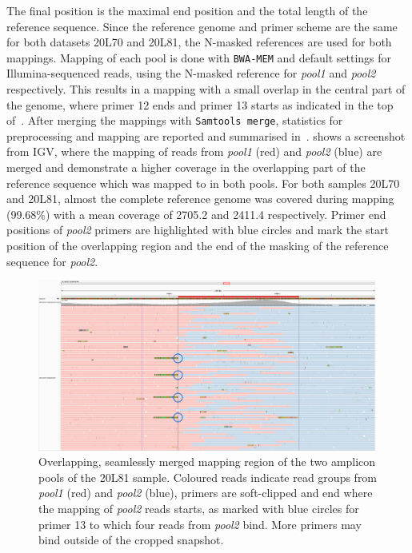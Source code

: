 The final position is the maximal end position and the total length of the reference sequence. Since the reference genome and primer scheme are the same for both datasets 20L70 and 20L81, the N-masked references are used for both mappings. Mapping of each pool is done with \texttt{BWA-MEM} and default settings for Illumina-sequenced reads, using the N-masked reference for \textit{pool1} and \textit{pool2} respectively. This results in a mapping with a small overlap in the central part of the genome, where primer 12 ends and primer 13 starts as indicated in the top of~. After merging the mappings with \texttt{Samtools merge}, statistics for preprocessing and mapping are reported and summarised in~.  shows a screenshot from \ac{IGV}, where the mapping of reads from \textit{pool1} (red) and \textit{pool2} (blue) are merged and demonstrate a higher coverage in the overlapping part of the reference sequence which was mapped to in both pools. For both samples 20L70 and 20L81, almost the complete reference genome was covered during mapping (99.68\%) with a mean coverage of {2705.2\texttimes } and {2411.4\texttimes } respectively. Primer end positions of \textit{pool2} primers are highlighted with blue circles and mark the start position of the overlapping region and the end of the masking of the reference sequence for \textit{pool2}.
\\

\begin{figure}[ht!]
    \centering
    \hspace*{-24pt}
    \includegraphics[width=1.1\textwidth]{media/4-lsdv-alig-20L81-c.png}
    \caption[Overlapping reads region of LSDV mapping in 20L81 sample.]{Overlapping, seamlessly merged mapping region of the two amplicon pools of the 20L81 sample. Coloured reads indicate read groups from \textit{pool1} (red) and \textit{pool2} (blue), primers are soft-clipped and end where the mapping of \textit{pool2} reads starts, as marked with blue circles for primer 13 to which four reads from \textit{pool2} bind. More primers may bind outside of the cropped snapshot.}
    \label{fig:4-lsdv-read-groups}
\end{figure}

